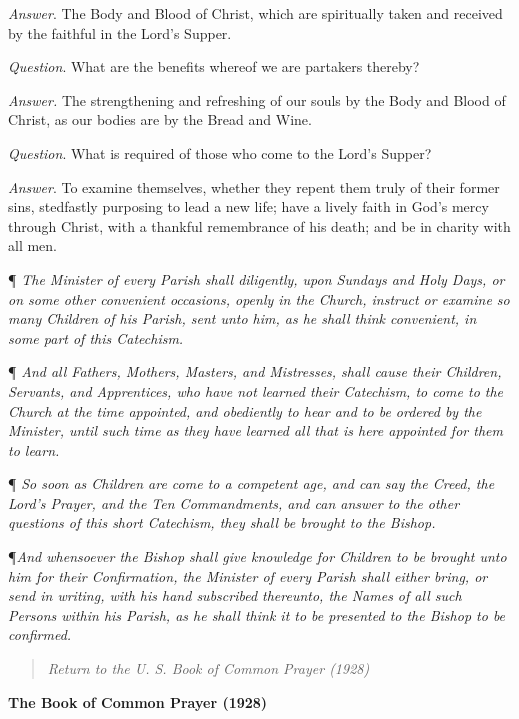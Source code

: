 \emph{Answer}. The Body and Blood of Christ,
which are spiritually taken and received by the faithful in the Lord's
Supper.

\emph{Question}. What are the benefits whereof
we are partakers thereby?

\emph{Answer.} The strengthening and refreshing
of our souls by the Body and Blood of Christ, as our bodies are by the
Bread and Wine.

\emph{Question}. What is required of those who
come to the Lord's Supper?

\emph{Answer}. To examine themselves, whether
they repent them truly of their former sins, stedfastly purposing to lead
a new life; have a lively faith in God's mercy through Christ, with a
thankful remembrance of his death; and be in charity with all men. 

¶
\emph{The Minister of every Parish shall diligently, upon Sundays and
Holy Days, or on some other convenient occasions, openly in the Church,
instruct or examine so many Children of his Parish, sent unto him, as
he shall think convenient, in some part of this Catechism.}

¶ \emph{And all Fathers, Mothers, Masters, and Mistresses, shall
cause their Children, Servants, and Apprentices, who have not learned
their Catechism, to come to the Church at the time appointed, and obediently
to hear and to be ordered by the Minister, until such time as they have
learned all that is here appointed for them to learn.}

¶ \emph{So soon as Children are come to a competent age, and can
say the Creed, the Lord's Prayer, and the Ten Commandments, and can
answer to the other questions of this short Catechism, they shall be
brought to the Bishop.}

¶\emph{And whensoever the Bishop shall give knowledge for Children
to be brought unto him for their Confirmation, the Minister of every
Parish shall either bring, or send in writing, with his hand subscribed
thereunto, the Names of all such Persons within his Parish, as he shall
think it to be presented to the Bishop to be confirmed.}

\begin{quote}

\emph{Return to the U.
S. Book of Common Prayer (1928)}

\end{quote}


\textbf{The Book of Common Prayer (1928)}

